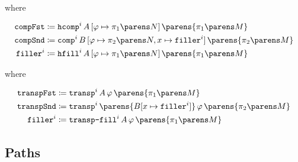 \documentclass[11pt]{article}
\begin{document}
\begin{prooftree*}
\end{prooftree*}

where

\begin{align*}
	\mathtt{compFst} & \defeq \mathtt{hcomp}^i\,A\,[\varphi\mapsto\pairfst{N}]\,\parens{\pairfst{M}} \\
	\mathtt{compSnd} & \defeq \mathtt{comp}^i\,B\,[\varphi\mapsto\pairsnd{N}, x\mapsto\mathtt{filler}^i]\,\parens{\pairsnd{M}} \\
	\mathtt{filler}^i & \defeq \mathtt{hfill}^i\,A\,[\varphi\mapsto\pairfst{N}]\,\parens{\pairfst{M}}
\end{align*}

\begin{prooftree*}
\end{prooftree*}

where

\begin{align*}
	\mathtt{transpFst} & \defeq \mathtt{transp}^i\,A\,\varphi\,\parens{\pairfst{M}} \\
	\mathtt{transpSnd} & \defeq \mathtt{transp}^i\,\parens{B[x\mapsto\mathtt{filler}^i]}\,\varphi\,\parens{\pairsnd{M}} \\
	\mathtt{filler}^i & \defeq \text{\texttt{transp-fill}}^i\,A\,\varphi\,\parens{\pairfst{M}}
\end{align*}

\subsection{Paths}

\begin{prooftree*}
\end{prooftree*}
\end{document}
